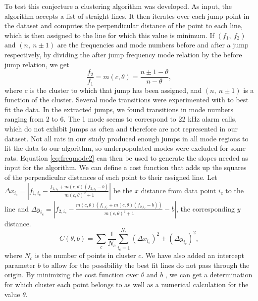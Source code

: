 \documentclass[twocolumn, prl]{revtex4}
\begin{document}
To test this conjecture a clustering algorithm was developed. As input, the algorithm accepts a list of straight lines. It then iterates over each jump point in the dataset and computes the perpendicular distance of the point to each line, which is then assigned to the line for which this value is minimum. If $\left(f_{1},\: f_{2}\right)$ and $\left(n,\: n\pm1\right)$ are the frequencies and mode numbers before and after a jump respectively, by dividing the after jump frequency mode relation by the before jump relation, we get \begin{equation}
\frac{f_{2}}{f_{1}}=m(c,\theta)=\frac{n\pm1-\theta}{n-\theta},\label{eq:freqmode2}
\end{equation}
where $c$ is the cluster to which that jump has been assigned, and $\left(n,\: n\pm1\right)$ is a function of the cluster. Several mode transitions were experimented with to best fit the data. In the extracted jumps, we found transitions in mode numbers ranging from 2 to 6. The 1 mode seems to correspond to 22 kHz alarm calls, which do not exhibit jumps as often and therefore are not represented in our dataset. Not all rats in our study produced enough jumps in all mode regions to fit the data to our algorithm, so underpopulated modes were excluded for some rats. Equation \ref{eq:freqmode2} can then be used to generate the slopes needed as input for the algorithm. We can define a cost function that adds up the squares of the perpendicular distances of each point to their assigned line. Let $\Delta x_{i_{c}}=\left\vert f_{1,i_{c}}-\frac{f_{1,i_{c}}+m\left(c,\theta\right)\left(f_{2,i_{c}}-b\right)}{m\left(c,\theta\right)^{2}+1}\right\vert $ be the $x$ distance from data point $i_c$ to the line and $\Delta y_{i_c}=\left\vert f_{2,i_{c}}-\frac{m\left(c,\theta\right)\left(f_{1,i_{c}}+m\left(c,\theta\right)\left(f_{2,i_{c}}-b\right)\right)}{m\left(c,\theta\right)^{2}+1} - b \right\vert$, the corresponding $y$ distance. 
\begin{equation}
C\left(\theta, b\right)=\sum_{c}\frac{1}{N_{c}}\sum_{i_c=1}^{N_{c}}\left(\Delta x_{i_c}\right)^{2}+\left(\Delta y_{i_c}\right)^{2},\label{eq:cost}
\end{equation}
where $N_{c}$ is the number of points in cluster $c$. We have also added an intercept parameter $b$ to allow for the possibility the best fit lines do not pass through the origin. By minimizing the cost function over $\theta$ and $b$ , we can get a determination for which cluster each point belongs to as well as a numerical calculation for the value $\theta$.
\end{document}
